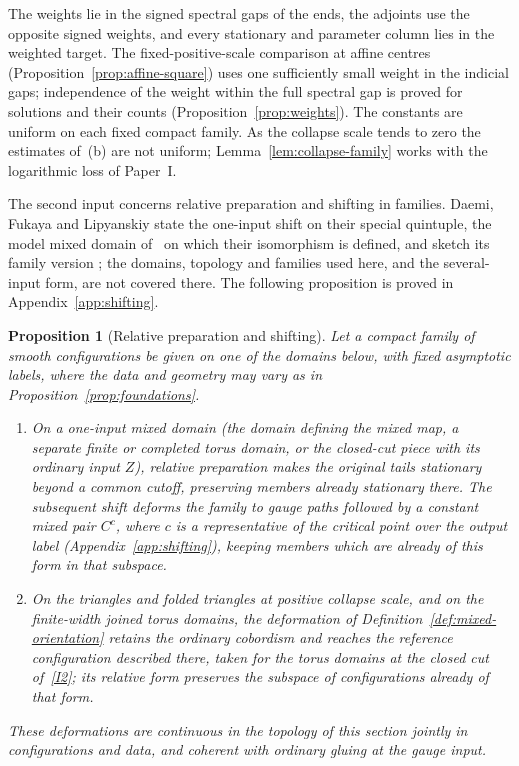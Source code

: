 \documentclass[11pt]{amsart}
\newtheorem{proposition}[theorem]{Proposition}
\theoremstyle{definition}
\theoremstyle{remark}
\theoremstyle{plain}
\numberwithin{equation}{section}
\begin{document}
The weights lie in the signed spectral gaps of the ends, the adjoints use the opposite signed
weights, and every stationary and parameter column lies in the weighted target. The
fixed-positive-scale comparison at affine centres (Proposition~\ref{prop:affine-square}) uses one
sufficiently small weight in the indicial gaps; independence of the weight within the full spectral
gap is proved for solutions and their counts (Proposition~\ref{prop:weights}). The constants are
uniform on each fixed compact family. As the collapse scale tends to zero the estimates of~(b) are
not uniform; Lemma~\ref{lem:collapse-family} works with the logarithmic loss of Paper~I.

The second input concerns relative preparation and shifting in
families. Daemi, Fukaya and Lipyanskiy state the one-input shift on
their special quintuple, the model mixed domain of~\cite[Section~3.1]{DFL} on which their
isomorphism is defined, and sketch its family version
\cite[Lemmas~4.62 and~4.64]{DFL}; the domains, topology and families
used here, and the several-input form, are not covered there. The
following proposition is proved in Appendix~\ref{app:shifting}.

\begin{proposition}[Relative preparation and shifting]\label{prop:shifting}
Let a compact family of smooth configurations be given on one of the
domains below, with fixed asymptotic labels, where the data and geometry
may vary as in Proposition~\ref{prop:foundations}.
\begin{enumerate}[label=(\alph*)]
\item On a one-input mixed domain (the domain defining the mixed map, a separate finite
or completed torus domain, or the closed-cut piece with its ordinary
input $Z$), relative preparation makes the original tails stationary
beyond a common cutoff, preserving members already stationary there.
The subsequent shift deforms the family to gauge paths followed by
a constant mixed pair $C^c$, where $c$ is a representative of the
critical point over the output label (Appendix~\ref{app:shifting}),
keeping members which are already of this form in that subspace.
\item On the triangles and folded triangles at positive collapse scale,
and on the finite-width joined torus domains, the deformation of
Definition~\ref{def:mixed-orientation} retains the ordinary cobordism and reaches the reference
configuration described there, taken for the torus domains at the closed cut of~\ref{I2}; its
relative form preserves the subspace of configurations already of that form.
\end{enumerate}
These deformations are continuous in the topology of this section jointly in configurations and data, and coherent with ordinary gluing at the gauge input.
\end{proposition}
\end{document}
